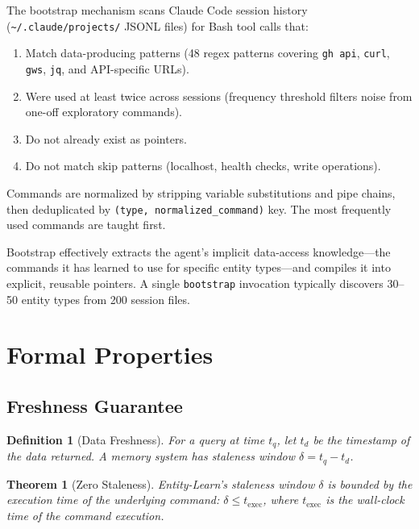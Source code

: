 \documentclass[11pt,twocolumn]{article}
\newtheorem{definition}{Definition}
\newtheorem{theorem}{Theorem}
\begin{document}
The bootstrap mechanism scans Claude Code session history (\texttt{\textasciitilde/.claude/projects/} JSONL files) for Bash tool calls that:

\begin{enumerate}[leftmargin=1.5em,itemsep=2pt]
  \item Match data-producing patterns (48 regex patterns covering \texttt{gh api}, \texttt{curl}, \texttt{gws}, \texttt{jq}, and API-specific URLs).
  \item Were used at least twice across sessions (frequency threshold filters noise from one-off exploratory commands).
  \item Do not already exist as pointers.
  \item Do not match skip patterns (localhost, health checks, write operations).
\end{enumerate}

Commands are normalized by stripping variable substitutions and pipe chains, then deduplicated by \texttt{(type, normalized\_command)} key.
The most frequently used commands are taught first.

Bootstrap effectively extracts the agent's implicit data-access knowledge---the commands it has learned to use for specific entity types---and compiles it into explicit, reusable pointers.
A single \texttt{bootstrap} invocation typically discovers 30--50 entity types from 200 session files.


\section{Formal Properties}
\label{sec:formal}

\subsection{Freshness Guarantee}

\begin{definition}[Data Freshness]
For a query at time $t_q$, let $t_d$ be the timestamp of the data returned. A memory system has \emph{staleness window} $\delta = t_q - t_d$.
\end{definition}

\begin{theorem}[Zero Staleness]
Entity-Learn's staleness window $\delta$ is bounded by the execution time of the underlying command: $\delta \leq t_{\text{exec}}$, where $t_{\text{exec}}$ is the wall-clock time of the command execution.
\end{theorem}
\end{document}
